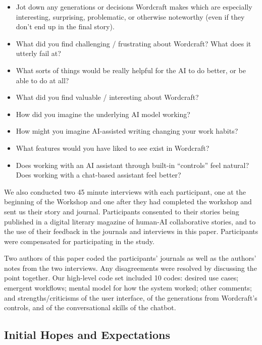 \begin{itemize}
    \item Jot down any generations or decisions Wordcraft makes which are especially interesting, surprising, problematic, or otherwise noteworthy (even if they don't end up in the final story).
    \item What did you find challenging / frustrating about Wordcraft?  What does it utterly fail at?
    \item  What sorts of things would be really helpful for the AI to do better, or be able to do at all?
    \item What did you find valuable / interesting about Wordcraft?
    \item How did you imagine the underlying AI model working?
    \item How might you imagine AI-assisted writing changing your work habits? 
    \item What features would you have liked to see exist in Wordcraft?
    \item Does working with an AI assistant through built-in “controls” feel natural? Does working with a chat-based assistant feel better?
\end{itemize}

We also conducted two 45 minute interviews with each participant, one at the beginning of the Workshop and one after they had completed the workshop and sent us their story and journal.
Participants consented to their stories being published in a digital literary magazine of human-AI collaborative stories, and to the use of their feedback in the journals and interviews in this paper.
Participants were compensated for participating in the study.

Two authors of this paper coded the participants' journals as well as the authors' notes from the two interviews.
Any disagreements were resolved by discussing the point together.
Our high-level code set included 10 codes: desired use cases; emergent workflows; mental model for how the system worked; other comments; and strengths/criticisms of the user interface, of the generations from Wordcraft's controls, and of the conversational skills of the chatbot.

\subsection{Initial Hopes and Expectations}
\label{sec:expectations}

